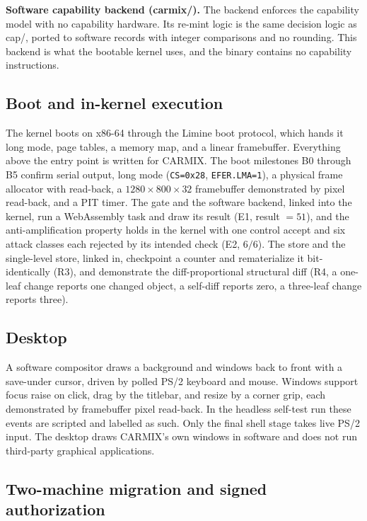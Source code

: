 \documentclass[10pt,twocolumn]{article}
\newcommand{\carmix}{CARMIX}
\begin{document}
\textbf{Software capability backend (carmix/).} The backend enforces the
capability model with no capability hardware. Its re-mint logic is the same
decision logic as cap/, ported to software records with integer comparisons and
no rounding. This backend is what the bootable kernel uses, and the binary
contains no capability instructions.

\subsection{Boot and in-kernel execution}

The kernel boots on x86-64 through the Limine boot protocol, which hands it long
mode, page tables, a memory map, and a linear framebuffer. Everything above the
entry point is written for \carmix{}. The boot milestones B0 through B5 confirm
serial output, long mode (\texttt{CS=0x28}, \texttt{EFER.LMA=1}), a physical frame
allocator with read-back, a $1280\times800\times32$ framebuffer demonstrated by pixel
read-back, and a PIT timer. The gate and the software backend, linked into the
kernel, run a WebAssembly task and draw its result (E1, result $=51$), and the
anti-amplification property holds in the kernel with one control accept and six
attack classes each rejected by its intended check (E2, $6/6$). The store and the
single-level store, linked in, checkpoint a counter and rematerialize it
bit-identically (R3), and demonstrate the diff-proportional structural diff (R4,
a one-leaf change reports one changed object, a self-diff reports zero, a
three-leaf change reports three).

\subsection{Desktop}

A software compositor draws a background and windows back to front with a
save-under cursor, driven by polled PS/2 keyboard and mouse. Windows support
focus raise on click, drag by the titlebar, and resize by a corner grip, each
demonstrated by framebuffer pixel read-back. In the headless self-test run these events
are scripted and labelled as such. Only the final shell stage takes live PS/2
input. The desktop draws \carmix{}'s own windows in software and does not run
third-party graphical applications.

\subsection{Two-machine migration and signed authorization}
\end{document}
